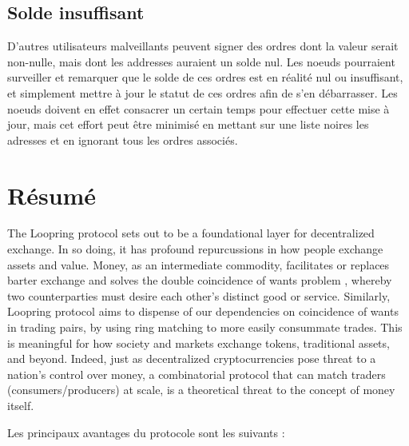 \documentclass[UTF8,nofonts]{article}
\begin{document}
\begin{multicols}{2}
\subsection{Solde insuffisant}
D'autres utilisateurs malveillants peuvent signer des ordres dont la valeur serait non-nulle, mais dont les addresses auraient un solde nul. Les noeuds pourraient surveiller et remarquer que le solde de ces ordres est en réalité nul ou insuffisant, et simplement mettre à jour le statut de ces ordres afin de s'en débarrasser. Les noeuds doivent en effet consacrer un certain temps pour effectuer cette mise à jour, mais cet effort peut être minimisé en mettant sur une liste noires les adresses et en ignorant tous les ordres associés.

\section{Résumé}

The Loopring protocol sets out to be a foundational layer for decentralized exchange. In so doing, it has profound repurcussions in how people exchange assets and value. Money, as an intermediate commodity, facilitates or replaces barter exchange and solves the double coincidence of wants problem \cite{unenumerated2006}, whereby two counterparties must desire each other's distinct good or service. Similarly, Loopring protocol aims to dispense of our dependencies on coincidence of wants in trading pairs, by using ring matching to more easily consummate trades. This is meaningful for how society and markets exchange tokens, traditional assets, and beyond. Indeed, just as decentralized cryptocurrencies pose threat to a nation's control over money, a combinatorial protocol that can match traders (consumers/producers) at scale, is a theoretical threat to the concept of money itself.

Les principaux avantages du protocole sont les suivants :


\end{multicols}
\end{document}
